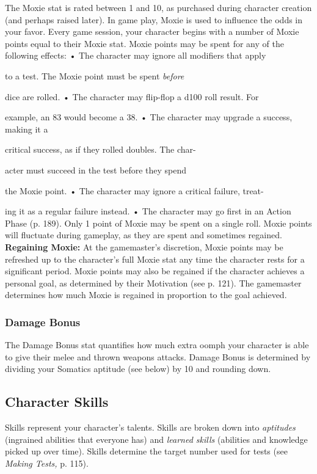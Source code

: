 The Moxie stat is rated between 1 and 10, as purchased
during character creation (and perhaps raised
later). In game play, Moxie is used to influence the 
odds in your favor. Every game session, your character 
begins with a number of Moxie points equal to their 
Moxie stat. Moxie points may be spent for any of the 
following effects:
•  The character may ignore all modifiers that apply 

to a test. The Moxie point must be spent \textit{before }

dice are rolled.
•  The character may flip-flop a d100 roll result. For 

example, an 83 would become a 38.
•  The character may upgrade a success, making it a 

critical success, as if they rolled doubles. The char-

acter must succeed in the test before they spend 

the Moxie point.
•  The character may ignore a critical failure, treat-

ing it as a regular failure instead.
•  The character may go first in an Action Phase (p. 189).
Only 1 point of Moxie may be spent on a single roll. 
Moxie points will fluctuate during gameplay, as they 
are spent and sometimes regained.
\textbf{Regaining Moxie:} At the gamemaster's discretion, 
Moxie points may be refreshed up to the character's 
full Moxie stat any time the character rests for a significant
period. Moxie points may also be regained if
the character achieves a personal goal, as determined 
by their Motivation (see p. 121). The gamemaster determines
how much Moxie is regained in proportion
to the goal achieved.

\subsubsection{Damage Bonus}

The Damage Bonus stat quantifies how much extra 
oomph your character is able to give their melee and 
thrown weapons attacks. Damage Bonus is determined
by dividing your Somatics aptitude (see below)
by 10 and rounding down.

\subsection{Character Skills}

Skills represent your character's talents. Skills are 
broken down into \textit{aptitudes} (ingrained abilities that 
everyone has) and \textit{learned skills} (abilities and knowledge
picked up over time). Skills determine the target
number used for tests (see \textit{Making Tests,} p. 115).

